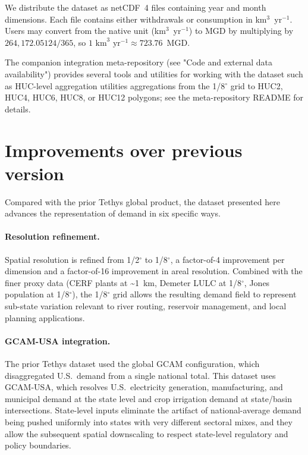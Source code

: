 \documentclass[fleqn,10pt]{wlscirep}
\begin{document}
We distribute the dataset as netCDF~4 files containing year and month dimensions. Each file contains either withdrawals or consumption in km$^3$~yr$^{-1}$. Users may convert from the native unit (km$^3$~yr$^{-1}$) to MGD by multiplying by $264{,}172.05124/365$, so $1\text{ km}^3\text{ yr}^{-1} \approx 723.76$~MGD.

The companion integration meta-repository (see "Code and external data availability") provides several tools and utilities for working with the dataset such as HUC-level aggregation utilities aggregations from the 1/8$^{\circ}$ grid to HUC2, HUC4, HUC6, HUC8, or HUC12 polygons; see the meta-repository README for details.

\section*{Improvements over previous version}

Compared with the prior Tethys global product\cite{Khan2023}, the dataset presented here advances the representation of demand in six specific ways.

\paragraph{Resolution refinement.} Spatial resolution is refined from 1/2$^{\circ}$ to 1/8$^{\circ}$, a factor-of-4 improvement per dimension and a factor-of-16 improvement in areal resolution. Combined with the finer proxy data (CERF plants at \textasciitilde1~km, Demeter LULC at 1/8$^{\circ}$, Jones population at 1/8$^{\circ}$), the 1/8$^{\circ}$ grid allows the resulting demand field to represent sub-state variation relevant to river routing, reservoir management, and local planning applications.

\paragraph{GCAM-USA integration.} The prior Tethys dataset used the global GCAM configuration, which disaggregated U.S.~demand from a single national total. This dataset uses GCAM-USA, which resolves U.S.~electricity generation, manufacturing, and municipal demand at the state level and crop irrigation demand at state/basin intersections. State-level inputs eliminate the artifact of national-average demand being pushed uniformly into states with very different sectoral mixes, and they allow the subsequent spatial downscaling to respect state-level regulatory and policy boundaries.
\end{document}
